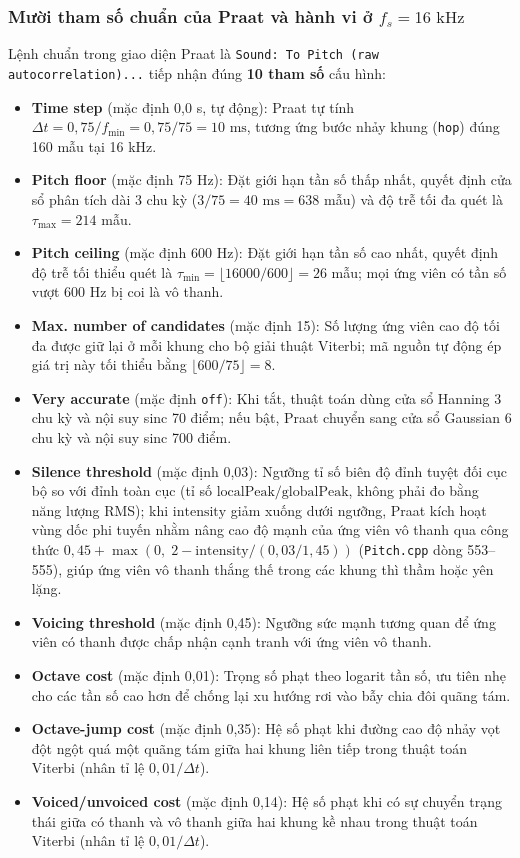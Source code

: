 \subsubsection*{Mười tham số chuẩn của Praat và hành vi ở $f_s = 16\text{ kHz}$}
Lệnh chuẩn trong giao diện Praat là \texttt{Sound: To Pitch (raw autocorrelation)...} tiếp nhận đúng \textbf{10 tham số} cấu hình:
\begin{itemize}[leftmargin=1.5em, itemsep=3pt]
    \item \textbf{Time step} (mặc định 0,0 s, tự động): Praat tự tính $\Delta t = 0{,}75 / f_{\min} = 0{,}75 / 75 = 10\text{ ms}$, tương ứng bước nhảy khung (\texttt{hop}) đúng 160 mẫu tại 16 kHz.
    \item \textbf{Pitch floor} (mặc định 75 Hz): Đặt giới hạn tần số thấp nhất, quyết định cửa sổ phân tích dài 3 chu kỳ ($3/75 = 40\text{ ms} = 638$ mẫu) và độ trễ tối đa quét là $\tau_{\max} = 214$ mẫu.
    \item \textbf{Pitch ceiling} (mặc định 600 Hz): Đặt giới hạn tần số cao nhất, quyết định độ trễ tối thiểu quét là $\tau_{\min} = \lfloor 16000 / 600 \rfloor = 26$ mẫu; mọi ứng viên có tần số vượt 600 Hz bị coi là vô thanh.
    \item \textbf{Max. number of candidates} (mặc định 15): Số lượng ứng viên cao độ tối đa được giữ lại ở mỗi khung cho bộ giải thuật Viterbi; mã nguồn tự động ép giá trị này tối thiểu bằng $\lfloor 600 / 75 \rfloor = 8$.
    \item \textbf{Very accurate} (mặc định \texttt{off}): Khi tắt, thuật toán dùng cửa sổ Hanning 3 chu kỳ và nội suy sinc 70 điểm; nếu bật, Praat chuyển sang cửa sổ Gaussian 6 chu kỳ và nội suy sinc 700 điểm.
    \item \textbf{Silence threshold} (mặc định 0,03): Ngưỡng tỉ số biên độ đỉnh tuyệt đối cục bộ so với đỉnh toàn cục (tỉ số $\text{localPeak} / \text{globalPeak}$, không phải đo bằng năng lượng RMS); khi $\text{intensity}$ giảm xuống dưới ngưỡng, Praat kích hoạt vùng dốc phi tuyến nhằm nâng cao độ mạnh của ứng viên vô thanh qua công thức $0{,}45 + \max(0, \; 2 - \text{intensity}/(0{,}03/1{,}45))$ (\texttt{Pitch.cpp} dòng 553--555), giúp ứng viên vô thanh thắng thế trong các khung thì thầm hoặc yên lặng.
    \item \textbf{Voicing threshold} (mặc định 0,45): Ngưỡng sức mạnh tương quan để ứng viên có thanh được chấp nhận cạnh tranh với ứng viên vô thanh.
    \item \textbf{Octave cost} (mặc định 0,01): Trọng số phạt theo logarit tần số, ưu tiên nhẹ cho các tần số cao hơn để chống lại xu hướng rơi vào bẫy chia đôi quãng tám.
    \item \textbf{Octave-jump cost} (mặc định 0,35): Hệ số phạt khi đường cao độ nhảy vọt đột ngột quá một quãng tám giữa hai khung liên tiếp trong thuật toán Viterbi (nhân tỉ lệ $0{,}01/\Delta t$).
    \item \textbf{Voiced/unvoiced cost} (mặc định 0,14): Hệ số phạt khi có sự chuyển trạng thái giữa có thanh và vô thanh giữa hai khung kề nhau trong thuật toán Viterbi (nhân tỉ lệ $0{,}01/\Delta t$).
\end{itemize}

